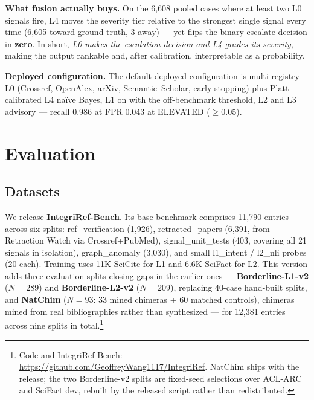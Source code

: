 \documentclass[runningheads]{llncs}
\begin{document}
\noindent\textbf{What fusion actually buys.} On the 6{,}608 pooled cases where at least two L0 signals fire, L4 moves the severity tier relative to the strongest single signal every time (6{,}605 toward ground truth, 3 away) --- yet flips the binary escalate decision in \textbf{zero}. In short, \emph{L0 makes the escalation decision and L4 grades its severity}, making the output rankable and, after calibration, interpretable as a probability.

\noindent\textbf{Deployed configuration.} The default deployed configuration is multi-registry L0 (Crossref, OpenAlex, arXiv, Semantic~Scholar, early-stopping) plus Platt-calibrated L4 na\"ive Bayes, L1 on with the off-benchmark threshold, L2 and L3 advisory --- recall 0.986 at FPR 0.043 at ELEVATED ($\geq$0.05).

\section{Evaluation}

\subsection{Datasets}
\label{ssec:datasets}

We release \textbf{IntegriRef-Bench}. Its base benchmark comprises 11{,}790 entries across six splits: ref\_verification (1{,}926), retracted\_papers (6{,}391, from Retraction Watch via Crossref+PubMed), signal\_unit\_tests (403, covering all 21 signals in isolation), graph\_anomaly (3{,}030), and small l1\_intent / l2\_nli probes (20 each). Training uses 11K SciCite \cite{cohan2019structural} for L1 and 6.6K SciFact \cite{wadden2020fact} for L2. This version adds three evaluation splits closing gaps in the earlier ones --- \textbf{Borderline-L1-v2} ($N{=}289$) and \textbf{Borderline-L2-v2} ($N{=}209$), replacing 40-case hand-built splits, and \textbf{NatChim} ($N{=}93$: 33 mined chimeras + 60 matched controls), chimeras mined from real bibliographies rather than synthesized --- for 12{,}381 entries across nine splits in total.\footnote{Code and IntegriRef-Bench: \url{https://github.com/GeoffreyWang1117/IntegriRef}. NatChim ships with the release; the two Borderline-v2 splits are fixed-seed selections over ACL-ARC and SciFact dev, rebuilt by the released script rather than redistributed.}
\end{document}
